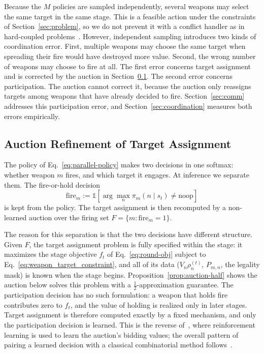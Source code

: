Because the $M$ policies are sampled independently, several weapons may select the same target in the same stage. This is a feasible action under the constraints of Section~\ref{sec:problem}, so we do not prevent it with a conflict handler as in hard-coupled problems~\cite{parco2024}. However, independent sampling introduces two kinds of coordination error. First, multiple weapons may choose the same target when spreading their fire would have destroyed more value. Second, the wrong number of weapons may choose to fire at all. The first error concerns target assignment and is corrected by the auction in Section~\ref{sec:auction}. The second error concerns participation. The auction cannot correct it, because the auction only reassigns targets among weapons that have already decided to fire. Section~\ref{sec:comm} addresses this participation error, and Section~\ref{sec:coordination} measures both errors empirically.

\subsection{Auction Refinement of Target Assignment}
\label{sec:auction}

The policy of Eq.~\eqref{eq:parallel-policy} makes two decisions in one softmax: whether weapon $m$ fires, and which target it engages. At inference we separate them. The fire-or-hold decision
\begin{equation}
\text{fire}_m := \mathbb{1}\!\left[\arg\max_n \pi_m(n \mid s_t) \neq \text{noop}\right]
\end{equation}
is kept from the policy. The target assignment is then recomputed by a non-learned auction over the firing set $F = \{m : \text{fire}_m = 1\}$.

The reason for this separation is that the two decisions have different structure. Given $F$, the target assignment problem is fully specified within the stage: it maximizes the stage objective $f_t$ of Eq.~\eqref{eq:round-obj} subject to Eq.~\eqref{eq:weapon_target_constraint}, and all of its data ($V_n\rho_n^{(t)}$, $P_{m,n}$, the legality mask) is known when the stage begins. Proposition~\ref{prop:auction-half} shows the auction below solves this problem with a $\tfrac12$-approximation guarantee. The participation decision has no such formulation: a weapon that holds fire contributes zero to $f_t$, and the value of holding is realized only in later stages. Target assignment is therefore computed exactly by a fixed mechanism, and only the participation decision is learned. This is the reverse of~\cite{sun2026grabbing}, where reinforcement learning is used to learn the auction's bidding values; the overall pattern of pairing a learned decision with a classical combinatorial method follows~\cite{delarue2020rl}.

